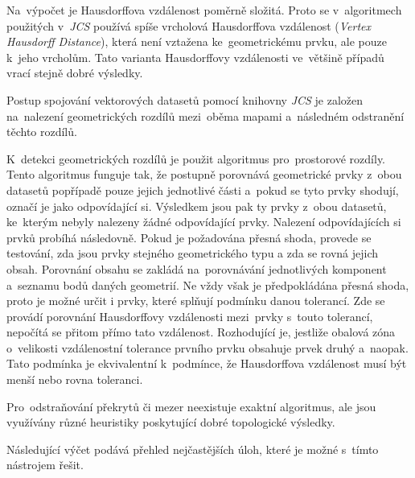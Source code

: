 Na~výpočet je Hausdorffova vzdálenost poměrně složitá. Proto se v~algoritmech použitých v~\textit{JCS} používá spíše vrcholová Hausdorffova vzdálenost (\textit{Vertex Hausdorff
 Distance}), která není vztažena ke~geometrickému prvku, ale pouze k~jeho vrcholům. Tato varianta Hausdorffovy vzdálenosti ve~většině případů vrací stejně dobré výsledky. 

Postup spojování vektorových datasetů pomocí knihovny \textit{JCS} je založen na~nalezení geometrických rozdílů mezi~oběma mapami a~následném odstranění těchto rozdílů.

K~detekci geometrických rozdílů je použit algoritmus pro~prostorové rozdíly. Tento algoritmus funguje tak, že postupně porovnává geometrické prvky z~obou datasetů popřípadě
 pouze jejich jednotlivé části a~pokud se tyto prvky shodují, označí je jako odpovídající si. Výsledkem jsou pak ty prvky z~obou datasetů, ke~kterým nebyly nalezeny žádné 
odpovídající prvky. Nalezení odpovídajících si prvků probíhá následovně. Pokud je požadována přesná shoda, provede se testování, zda jsou prvky stejného geometrického typu a
zda se rovná jejich obsah. Porovnání obsahu se zakládá na~porovnávání jednotlivých komponent a~seznamu bodů daných geometrií. Ne vždy však je předpokládána přesná shoda,
proto je možné určit i prvky, které splňují podmínku danou tolerancí. Zde se provádí porovnání Hausdorffovy vzdálenosti mezi~prvky s~touto tolerancí, nepočítá se přitom přímo
tato vzdálenost. Rozhodující je, jestliže obalová zóna o~velikosti vzdálenostní tolerance prvního prvku obsahuje prvek druhý a~naopak. Tato podmínka je ekvivalentní k~podmínce,
že Hausdorffova vzdálenost musí být menší nebo rovna toleranci. 


Pro~odstraňování překrytů či mezer neexistuje exaktní algoritmus, ale jsou využívány různé heuristiky poskytující dobré topologické výsledky.

Následující výčet podává přehled nejčastějších úloh, které je možné s~tímto nástrojem řešit.

